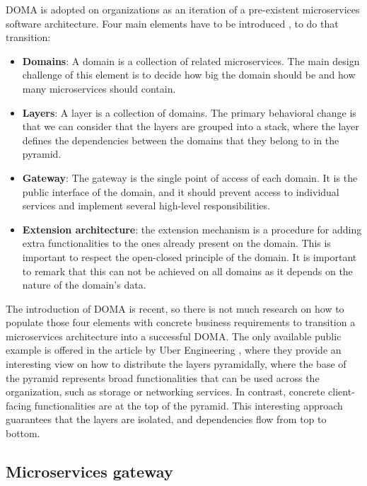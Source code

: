 \documentclass[english, 12pt, a4paper, sci, utf8, a-1b, online]{aaltothesis}
\begin{document}
DOMA is adopted on organizations as an iteration of a pre-existent microservices software architecture. Four main elements have to be introduced \cite{DOMAUber}, to do that transition:

\begin{itemize}
    \item \textbf{Domains}: A domain is a collection of related microservices. The main design challenge of this element is to decide how big the domain should be and how many microservices should contain.
    \item \textbf{Layers}: A layer is a collection of domains. The primary behavioral change is that we can consider that the layers are grouped into a stack, where the layer defines the dependencies between the domains that they belong to in the pyramid.
    \item \textbf{Gateway}: The gateway is the single point of access of each domain. It is the public interface of the domain, and it should prevent access to individual services and implement several high-level responsibilities.
    \item \textbf{Extension architecture}: the extension mechanism is a procedure for adding extra functionalities to the ones already present on the domain. This is important to respect the open-closed principle of the domain. It is important to remark that this can not be achieved on all domains as it depends on the nature of the domain's data.
\end{itemize}

The introduction of DOMA is recent, so there is not much research on how to populate those four elements with concrete business requirements to transition a microservices architecture into a successful DOMA. The only available public example is offered in the article by Uber Engineering \cite{DOMAUber}, where they provide an interesting view on how to distribute the layers pyramidally, where the base of the pyramid represents broad functionalities that can be used across the organization, such as storage or networking services. In contrast, concrete client-facing functionalities are at the top of the pyramid. This interesting approach guarantees that the layers are isolated, and dependencies flow from top to bottom.

\subsection{Microservices gateway}
\label{sec:microservices-gateway}
\end{document}
